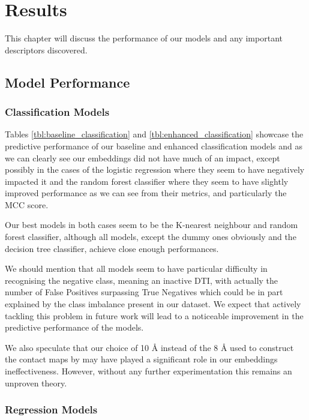 \section{Results}

This chapter will discuss the performance of our models and any important descriptors discovered.

\subsection{Model Performance}

\subsubsection{Classification Models}

Tables \ref{tbl:baseline_classification} and \ref{tbl:enhanced_classification} showcase the predictive performance of our baseline and enhanced classification models and as we can clearly see our embeddings did not have much of an impact, except possibly in the cases of the logistic regression where they seem to have negatively impacted it and the random forest classifier where they seem to have slightly improved performance as we can see from their metrics, and particularly the MCC score.

Our best models in both cases seem to be the K-nearest neighbour and random forest classifier, although all models, except the dummy ones obviously and the decision tree classifier, achieve close enough performances.

We should mention that all models seem to have particular difficulty in recognising the negative class, meaning an inactive DTI, with actually the number of False Positives surpassing True Negatives which could be in part explained by the class imbalance present in our dataset. We expect that actively tackling this problem in future work will lead to a noticeable improvement in the predictive performance of the models.

We also speculate that our choice of 10 \AA {} instead of the 8 \AA {} used to construct the contact maps by \citet{Jiang2020} may have played a significant role in our embeddings ineffectiveness. However, without any further experimentation this remains an unproven theory.

\subsubsection{Regression Models}


